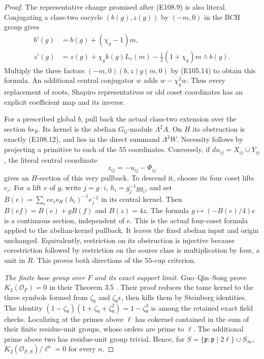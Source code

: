 \begin{proof}
The representative change promised after (E108.9) is also
literal.  Conjugating a class-two cocycle $(b(g),z(g))$ by
$(-m,0)$ in the BCH group gives
\[
 \begin{split}
 b'(g)&=b(g)+(\chi_g-1)m,\\
 z'(g)&=z(g)+\chi_gk(g)L_v(m)
                         -\tfrac12(1+\chi_g)m\wedge b(g).
 \end{split}
 \tag{E108.13}
\]
Multiply the three factors
$(-m,0)(b,z)g(m,0)$ by (E105.14) to obtain this formula.
An additional central conjugator $w$ adds
$w-\chi_g^2w$.  Thus every replacement of roots, Shapiro
representatives or old coset coordinates has an explicit
coefficient map and its inverse.

For a prescribed global $b$, pull back the actual class-two
extension over the section $b s_R$.  Its kernel is the
abelian $G_{\mathbb Q}$-module $\Lambda^2A$.
On $H$ its obstruction is exactly (E108.12), and lies in
the direct summand $\Lambda^2 W$.  Necessity follows by
projecting a primitive to each of the $55$ coordinates.
Conversely, if $du_{ij}=X_{ij}\cup Y_{ij}$, the literal
central coordinate
\[
              z_{ij}=-u_{ij}-\Phi_{ij}
 \tag{E108.14}
\]
gives an $H$-section of this very pullback.  To descend it,
choose its four coset lifts $e_i$.  For a lift $e$ of $g$,
write $j=g\cdot i$, $h_i=g_j^{-1}gg_i$, and set
$B(e)=\sum_i e e_i s_H(h_i)^{-1}e_j^{-1}$ in its central
kernel.  Then $B(ef)=B(e)+gB(f)$ and $B(z)=4z$.
The formula $g\mapsto(-B(e)/4)e$ is a continuous section,
independent of $e$.  This is the actual four-coset formula
applied to the abelian-kernel pullback.  It leaves the fixed
abelian input and origin unchanged.  Equivalently,
restriction on its obstruction is injective because
corestriction followed by restriction on the source class
is multiplication by four, a unit in $R$.
This proves both directions of the $55$-cup criterion.

\emph{The finite base group over $F$ and its exact support limit.}
Guo--Qin--Song prove
$K_2(\mathcal O_F)=0$ in their Theorem 3.5
\cite[Theorem 3.5 and its proof]{E108_GuoQinSong}.
Their proof reduces the tame kernel to the three symbols
formed from $\zeta_8$ and $\zeta_8\epsilon$, then kills them
by Steinberg identities.  The identity
$(1-\zeta_8)(1+\zeta_8+\zeta_8^2)=1-\zeta_8^3$
is among the retained exact field checks.
Localizing at the primes above $\ell$ has cokernel contained
in the sum of their finite residue-unit groups, whose orders
are prime to $\ell$.  The additional prime above two has
residue-unit group trivial.  Hence, for
$S=\{\mathfrak p:\mathfrak p\mid2\ell\}\cup S_\infty$,
$K_2(\mathcal O_{F,S})/\ell^n=0$ for every $n$.


\end{proof}
